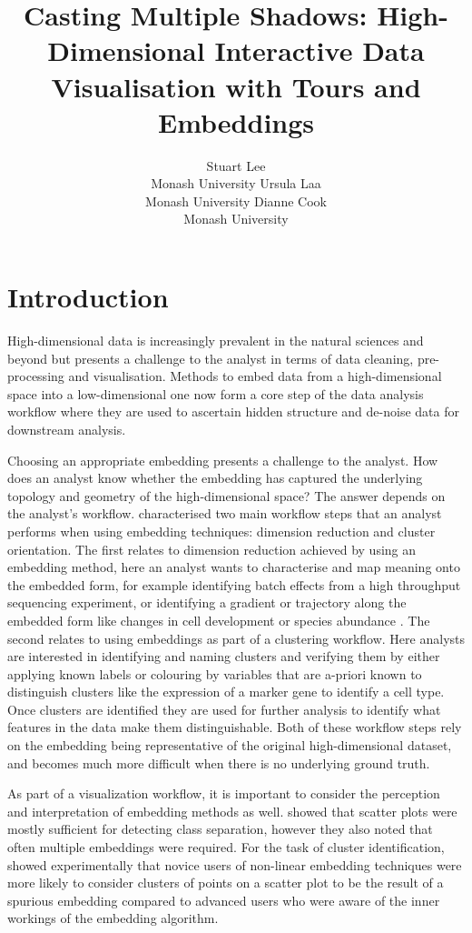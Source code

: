 \documentclass[article,notitle]{jdssv}
\author{
Stuart Lee\\Monash University \And Ursula Laa\\Monash University \And Dianne Cook\\Monash University
}
\title{Casting Multiple Shadows: High-Dimensional Interactive Data Visualisation with Tours and Embeddings}
\begin{document}
\hypertarget{introduction}{%
\section{Introduction}\label{introduction}}

High-dimensional data is increasingly prevalent in the natural sciences and
beyond but presents a challenge to the analyst in terms of data cleaning,
pre-processing and visualisation. Methods to embed data from a high-dimensional
space into a low-dimensional one now form a core step of the data analysis
workflow where they are used to ascertain hidden structure and de-noise data
for downstream analysis.

Choosing an appropriate embedding presents a challenge to the analyst. How does
an analyst know whether the embedding has captured the underlying topology and
geometry of the high-dimensional space? The answer depends on the analyst's
workflow. \citet{Brehmer2014-hk} characterised two main workflow steps that an
analyst performs when using embedding techniques: dimension reduction and
cluster orientation. The first relates to dimension reduction achieved by using
an embedding method, here an analyst wants to characterise and map meaning onto
the embedded form, for example identifying batch effects from a high throughput
sequencing experiment, or identifying a gradient or trajectory along the
embedded form like changes in cell development or species abundance \citep{Nguyen2019-yh}. The second relates to using embeddings as part of
a clustering workflow. Here analysts are interested in identifying and naming
clusters and verifying them by either applying known labels or colouring by
variables that are a-priori known to distinguish clusters like the expression of a marker gene to identify a cell type. Once clusters are identified they are used for further analysis to identify what features in the data make them distinguishable. Both of these
workflow steps rely on the embedding being representative of the original high-dimensional dataset, and becomes much more difficult when there is no underlying ground truth.

As part of a visualization workflow, it is important to consider the perception
and interpretation of embedding methods as well. \citet{Sedlmair2013-pn} showed that
scatter plots were mostly sufficient for detecting class separation, however
they also noted that often multiple embeddings were required. For the task of
cluster identification, \citet{Lewis2012-ai} showed experimentally that novice users
of non-linear embedding techniques were more likely to consider clusters of
points on a scatter plot to be the result of a spurious embedding compared
to advanced users who were aware of the inner workings of the embedding
algorithm.
\end{document}
